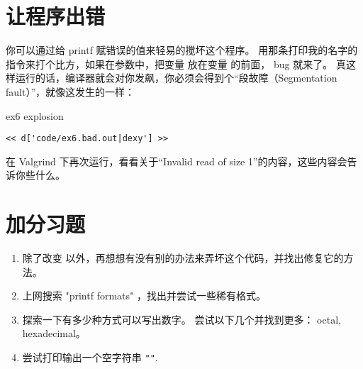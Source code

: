 \section{让程序出错}

你可以通过给 printf 赋错误的值来轻易的搅坏这个程序。 用那条打印我的名字的指令来打个比方，如果在参数中，把变量  放在变量  的前面， bug 就来了。 真这样运行的话，编译器就会对你发飙，你必须会得到个“段故障（Segmentation fault）”，就像这发生的一样：

\begin{code}{ex6 explosion}
\begin{lstlisting}
<< d['code/ex6.bad.out|dexy'] >>
\end{lstlisting}
\end{code}

在 Valgrind 下再次运行，看看关于“Invalid read of size 1”的内容，这些内容会告诉你些什么。


\section{加分习题}

\begin{enumerate}
\item 除了改变  以外，再想想有没有别的办法来弄坏这个代码，并找出修复它的方法。
\item 上网搜索 "printf formats" ，找出并尝试一些稀有格式。
\item 探索一下有多少种方式可以写出数字。 尝试以下几个并找到更多： octal, hexadecimal。
\item 尝试打印输出一个空字符串 \verb|""|.
\end{enumerate}

